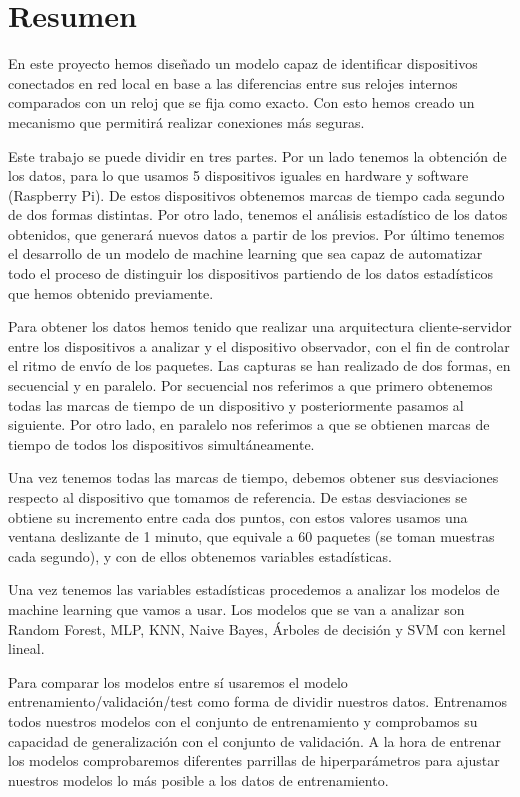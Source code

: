 
\chapter*{Resumen}

En este proyecto hemos diseñado un modelo capaz de identificar dispositivos conectados en red local en base a las diferencias entre sus relojes internos comparados con un reloj que se fija como exacto. Con esto hemos creado un mecanismo que permitirá realizar conexiones más seguras.

Este trabajo se puede dividir en tres partes. Por un lado tenemos la obtención de los datos, para lo que usamos 5 dispositivos iguales en hardware y software (Raspberry Pi). De estos dispositivos obtenemos marcas de tiempo cada segundo de dos formas distintas. Por otro lado, tenemos el análisis estadístico de los datos obtenidos, que generará nuevos datos a partir de los previos. Por último tenemos el desarrollo de un modelo de machine learning que sea capaz de automatizar todo el proceso de distinguir los dispositivos partiendo de los datos estadísticos que hemos obtenido previamente.

Para obtener los datos hemos tenido que realizar una arquitectura cliente-servidor entre los dispositivos a analizar y el dispositivo observador, con el fin de controlar el ritmo de envío de los paquetes. Las capturas se han realizado de dos formas, en secuencial y en paralelo. Por secuencial nos referimos a que primero obtenemos todas las marcas de tiempo de un dispositivo y posteriormente pasamos al siguiente. Por otro lado, en paralelo nos referimos a que se obtienen marcas de tiempo de todos los dispositivos simultáneamente.

Una vez tenemos todas las marcas de tiempo, debemos obtener sus desviaciones respecto al dispositivo que tomamos de referencia. De estas desviaciones se obtiene su incremento entre cada dos puntos, con estos valores usamos una ventana deslizante de 1 minuto, que equivale a 60 paquetes (se toman muestras cada segundo), y con de ellos obtenemos variables estadísticas.

Una vez tenemos las variables estadísticas procedemos a analizar los modelos de machine learning que vamos a usar. Los modelos que se van a analizar son Random Forest, MLP, KNN, Naive Bayes, Árboles de decisión y SVM con kernel lineal. 

Para comparar los modelos entre sí usaremos el modelo entrenamiento/validación/test como forma de dividir nuestros datos. Entrenamos todos nuestros modelos con el conjunto de entrenamiento y comprobamos su capacidad de generalización con el conjunto de validación. A la hora de entrenar los modelos comprobaremos diferentes parrillas de hiperparámetros para ajustar nuestros modelos lo más posible a los datos de entrenamiento.

